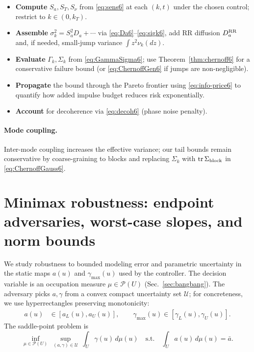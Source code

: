 \documentclass[aps,pre,twocolumn,showpacs,superscriptaddress]{revtex4-2}
\theoremstyle{definition}
\begin{document}
\begin{itemize}[leftmargin=1.4em,itemsep=2pt]
\item \textbf{Compute} $S_a,S_T,S_\nu$ from \eqref{eq:sens6} at each $(k,t)$ under the chosen control; restrict to $k\in(0,k_T)$.
\item \textbf{Assemble} $\sigma_k^2=S_a^2D_a+\cdots$ via \eqref{eq:Da6}–\eqref{eq:sigk6}, add RR diffusion $D_a^{\rm RR}$ and, if needed, small‑jump variance $\int z^2\nu_k(dz)$.
\item \textbf{Evaluate} $\Gamma_k,\Sigma_k$ from \eqref{eq:GammaSigma6}; use Theorem~\ref{thm:chernoff6} for a conservative failure bound (or \eqref{eq:ChernoffGen6} if jumps are non‑negligible).
\item \textbf{Propagate} the bound through the Pareto frontier using \eqref{eq:info-price6} to quantify how added impulse budget reduces risk exponentially.
\item \textbf{Account} for decoherence via \eqref{eq:decoh6} (phase noise penalty).
\end{itemize}

\paragraph*{Mode coupling.}
Inter-mode coupling increases the effective variance; our tail bounds remain conservative by coarse-graining to blocks and replacing $\Sigma_k$ with $\mathrm{tr}\,\Sigma_{\rm block}$ in \eqref{eq:ChernoffGauss6}.

\section{Minimax robustness: endpoint adversaries, worst-case slopes, and norm bounds}\label{sec:minimax}

We study robustness to bounded modeling error and parametric uncertainty in the static maps $a(u)$ and $\gamma_{\max}(u)$ used by the controller. The decision variable is an occupation measure $\mu\in\mathcal{P}(U)$ (Sec.~\ref{sec:bangbang}). The adversary picks $a,\gamma$ from a convex compact uncertainty set $\mathcal{U}$; for concreteness, we use hyperrectangles preserving monotonicity:
\begin{align}
a(u) &\in [a_L(u),a_U(u)], \qquad \gamma_{\max}(u)\in [\gamma_L(u),\gamma_U(u)]. \label{eq:Ubox7}
\end{align}
The saddle-point problem is
\begin{equation}\label{eq:minimax7}
\inf_{\mu\in\mathcal{P}(U)}\ \sup_{(a,\gamma)\in\mathcal{U}}\ \int_U \gamma(u)\,d\mu(u)
\quad \text{s.t.}\quad \int_U a(u)\,d\mu(u)=\bar a.
\end{equation}
\end{document}

